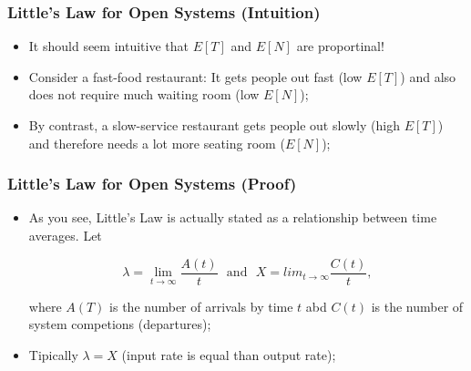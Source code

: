 \begin{frame}
    \frametitle{Little's Law for Open Systems (Intuition)}

    
    \begin{itemize}

        \item It should seem intuitive that $E[T]$ and $E[N]$ are proportinal!

        \item Consider a fast-food restaurant: It gets people out fast (low $E[T]$)
        and also does not require much waiting room (low $E[N]$);

        \item By contrast, a slow-service restaurant gets people out slowly 
        (high $E[T]$) and therefore needs a lot more seating room ($E[N]$);


    \end{itemize}

\end{frame}




\begin{frame}
    \frametitle{Little's Law for Open Systems (Proof)}

    
    \begin{itemize}

        \item As you see, Little's Law is actually stated as a relationship
        between time averages. Let

        $$\lambda = \lim_{t \to\infty} \frac{A(t)}{t} \text{~~and~~} X = lim_{t \to\infty} \frac{C(t)}{t},$$

        where $A(T)$ is the number of arrivals by time $t$ abd $C(t)$ is the number
        of system competions (departures);

        \item Tipically {\color{red}$\lambda=X$} (input rate is equal than output rate);

    \end{itemize}

\end{frame}



